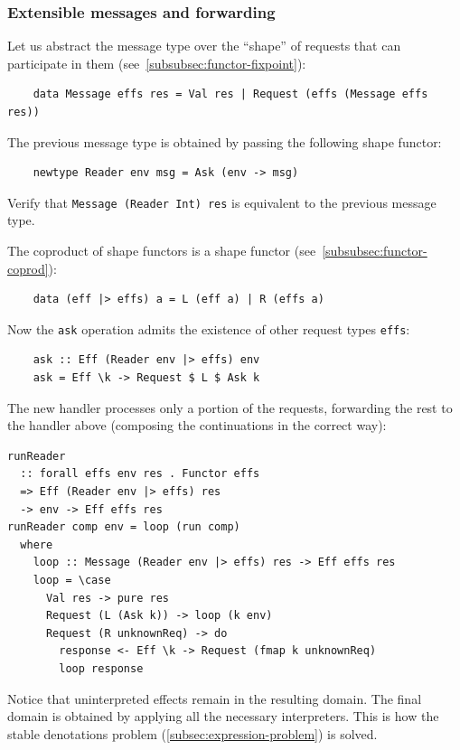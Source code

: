 \subsubsection{Extensible messages and forwarding} \label{subsubsec:extensible-messages}

Let us abstract the message type over the ``shape'' of requests that can participate in them (see\ \ref{subsubsec:functor-fixpoint}):
\begin{verbatim}
    data Message effs res = Val res | Request (effs (Message effs res))
\end{verbatim}

The previous message type is obtained by passing the following shape functor:
\begin{verbatim}
    newtype Reader env msg = Ask (env -> msg)
\end{verbatim}

\begin{task}
    Verify that \texttt{Message (Reader Int) res} is equivalent to the previous message type.
\end{task}

The coproduct of shape functors is a shape functor (see\ \ref{subsubsec:functor-coprod}):
\begin{verbatim}
    data (eff |> effs) a = L (eff a) | R (effs a)
\end{verbatim}

Now the \texttt{ask} operation admits the existence of other request types \texttt{effs}:
\begin{verbatim}
    ask :: Eff (Reader env |> effs) env
    ask = Eff \k -> Request $ L $ Ask k
\end{verbatim}

The new handler processes only a portion of the requests, forwarding the rest to the handler above (composing the continuations in the correct way):
\begin{verbatim}
runReader
  :: forall effs env res . Functor effs
  => Eff (Reader env |> effs) res
  -> env -> Eff effs res
runReader comp env = loop (run comp)
  where
    loop :: Message (Reader env |> effs) res -> Eff effs res
    loop = \case
      Val res -> pure res
      Request (L (Ask k)) -> loop (k env)
      Request (R unknownReq) -> do
        response <- Eff \k -> Request (fmap k unknownReq)
        loop response
\end{verbatim}

Notice that uninterpreted effects remain in the resulting domain.
The final domain is obtained by applying all the necessary interpreters.
This is how the stable denotations problem (\ref{subsec:expression-problem}) is solved.

